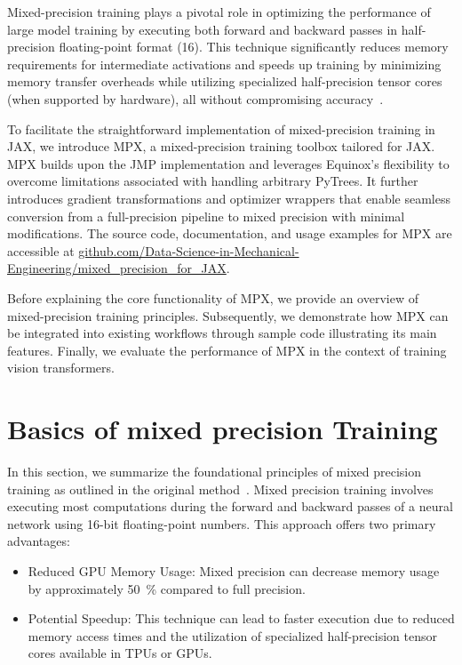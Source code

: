\documentclass[copyright, logo]{dsme}
\newcommand{\mpx}{\textsc{MPX}}
\begin{document}
Mixed-precision training plays a pivotal role in optimizing the performance of large model training by executing both forward and backward passes in half-precision floating-point format (\qty{16}{\bit}). 
This technique significantly reduces memory requirements for intermediate activations and speeds up training by minimizing memory transfer overheads while utilizing specialized half-precision tensor cores (when supported by hardware), all without compromising accuracy~\citep{mixed_precision_paper}.

To facilitate the straightforward implementation of mixed-precision training in JAX, we introduce \mpx{}, a mixed-precision training toolbox tailored for JAX. 
\mpx{} builds upon the JMP implementation and leverages Equinox's flexibility to overcome limitations associated with handling arbitrary PyTrees. 
It further introduces gradient transformations and optimizer wrappers that enable seamless conversion from a full-precision pipeline to mixed precision with minimal modifications. The source code, documentation, and usage examples for \mpx{} are accessible at \url{github.com/Data-Science-in-Mechanical-Engineering/mixed_precision_for_JAX}.

Before explaining the core functionality of \mpx{}, we provide an overview of mixed-precision training principles. 
Subsequently, we demonstrate how \mpx{} can be integrated into existing workflows through sample code illustrating its main features.
Finally, we evaluate the performance of \mpx{} in the context of training vision transformers.

\section{Basics of mixed precision Training}
In this section, we summarize the foundational principles of mixed precision training as outlined in the original method~\citep{mixed_precision_paper}. 
Mixed precision training involves executing most computations during the forward and backward passes of a neural network using 16-bit floating-point numbers. 
This approach offers two primary advantages: 
\begin{itemize} 
    \item Reduced GPU Memory Usage: Mixed precision can decrease memory usage by approximately \SI{50}{\percent} compared to full precision. 
    \item Potential Speedup: This technique can lead to faster execution due to reduced memory access times and the utilization of specialized half-precision tensor cores available in TPUs or GPUs. 
\end{itemize}
\end{document}
